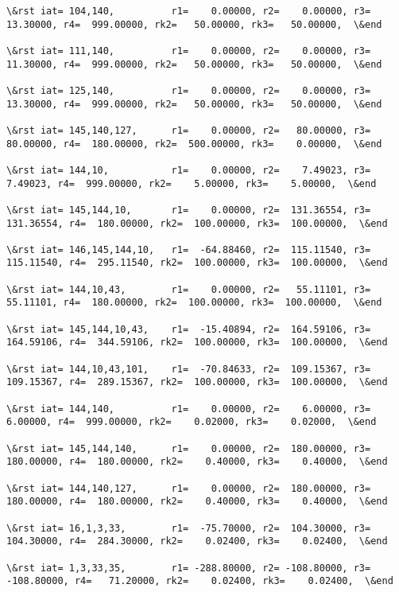\documentclass[11pt]{article}
\begin{document}
\begin{Verbatim}[commandchars=\\\{\}]
\&rst iat= 104,140,          r1=    0.00000, r2=    0.00000, r3=   13.30000, r4=  999.00000, rk2=   50.00000, rk3=   50.00000,  \&end

\&rst iat= 111,140,          r1=    0.00000, r2=    0.00000, r3=   11.30000, r4=  999.00000, rk2=   50.00000, rk3=   50.00000,  \&end

\&rst iat= 125,140,          r1=    0.00000, r2=    0.00000, r3=   13.30000, r4=  999.00000, rk2=   50.00000, rk3=   50.00000,  \&end

\&rst iat= 145,140,127,      r1=    0.00000, r2=   80.00000, r3=   80.00000, r4=  180.00000, rk2=  500.00000, rk3=    0.00000,  \&end

\&rst iat= 144,10,           r1=    0.00000, r2=    7.49023, r3=    7.49023, r4=  999.00000, rk2=    5.00000, rk3=    5.00000,  \&end

\&rst iat= 145,144,10,       r1=    0.00000, r2=  131.36554, r3=  131.36554, r4=  180.00000, rk2=  100.00000, rk3=  100.00000,  \&end

\&rst iat= 146,145,144,10,   r1=  -64.88460, r2=  115.11540, r3=  115.11540, r4=  295.11540, rk2=  100.00000, rk3=  100.00000,  \&end

\&rst iat= 144,10,43,        r1=    0.00000, r2=   55.11101, r3=   55.11101, r4=  180.00000, rk2=  100.00000, rk3=  100.00000,  \&end

\&rst iat= 145,144,10,43,    r1=  -15.40894, r2=  164.59106, r3=  164.59106, r4=  344.59106, rk2=  100.00000, rk3=  100.00000,  \&end

\&rst iat= 144,10,43,101,    r1=  -70.84633, r2=  109.15367, r3=  109.15367, r4=  289.15367, rk2=  100.00000, rk3=  100.00000,  \&end

\&rst iat= 144,140,          r1=    0.00000, r2=    6.00000, r3=    6.00000, r4=  999.00000, rk2=    0.02000, rk3=    0.02000,  \&end

\&rst iat= 145,144,140,      r1=    0.00000, r2=  180.00000, r3=  180.00000, r4=  180.00000, rk2=    0.40000, rk3=    0.40000,  \&end

\&rst iat= 144,140,127,      r1=    0.00000, r2=  180.00000, r3=  180.00000, r4=  180.00000, rk2=    0.40000, rk3=    0.40000,  \&end

\&rst iat= 16,1,3,33,        r1=  -75.70000, r2=  104.30000, r3=  104.30000, r4=  284.30000, rk2=    0.02400, rk3=    0.02400,  \&end

\&rst iat= 1,3,33,35,        r1= -288.80000, r2= -108.80000, r3= -108.80000, r4=   71.20000, rk2=    0.02400, rk3=    0.02400,  \&end


\end{Verbatim}
\end{document}
